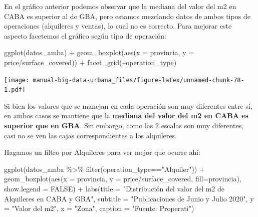 \documentclass[
  spanish,
]{book}
\newenvironment{Shaded}{\begin{snugshade}}{\end{snugshade}}
\newcommand{\AttributeTok}[1]{\textcolor[rgb]{0.77,0.63,0.00}{#1}}
\newcommand{\ConstantTok}[1]{\textcolor[rgb]{0.00,0.00,0.00}{#1}}
\newcommand{\FunctionTok}[1]{\textcolor[rgb]{0.00,0.00,0.00}{#1}}
\newcommand{\NormalTok}[1]{#1}
\newcommand{\SpecialCharTok}[1]{\textcolor[rgb]{0.00,0.00,0.00}{#1}}
\newcommand{\StringTok}[1]{\textcolor[rgb]{0.31,0.60,0.02}{#1}}
\begin{document}
En el gráfico anterior podemos observar que la mediana del valor del m2 en CABA es superior al de GBA, pero estamos mezclando datos de ambos tipos de operaciones (alquileres y ventas), lo cual no es correcto. Para mejorar este aspecto facetemos el gráfico según tipo de operación:

\begin{Shaded}
\begin{Highlighting}[]
\FunctionTok{ggplot}\NormalTok{(datos\_amba) }\SpecialCharTok{+}
  \FunctionTok{geom\_boxplot}\NormalTok{(}\FunctionTok{aes}\NormalTok{(}\AttributeTok{x =}\NormalTok{ provincia, }\AttributeTok{y =}\NormalTok{ price}\SpecialCharTok{/}\NormalTok{surface\_covered)) }\SpecialCharTok{+}
  \FunctionTok{facet\_grid}\NormalTok{(}\SpecialCharTok{\textasciitilde{}}\NormalTok{operation\_type)}
\end{Highlighting}
\end{Shaded}

\texttt{[image: manual-big-data-urbana\_files/figure-latex/unnamed-chunk-78-1.pdf]}

Si bien los valores que se manejan en cada operación son muy diferentes entre sí, en ambos casos se mantiene que la \textbf{mediana del valor del m2 en CABA es superior que en GBA}. Sin embargo, como las 2 escalas son muy diferentes, casi no se ven las cajas correspondientes a los alquileres.

Hagamos un filtro por Alquileres para ver mejor que ocurre ahí:

\begin{Shaded}
\begin{Highlighting}[]
\FunctionTok{ggplot}\NormalTok{(datos\_amba }\SpecialCharTok{\%\textgreater{}\%}
         \FunctionTok{filter}\NormalTok{(operation\_type}\SpecialCharTok{==}\StringTok{"Alquiler"}\NormalTok{)) }\SpecialCharTok{+}
  \FunctionTok{geom\_boxplot}\NormalTok{(}\FunctionTok{aes}\NormalTok{(}\AttributeTok{x =}\NormalTok{ provincia, }\AttributeTok{y =}\NormalTok{ price}\SpecialCharTok{/}\NormalTok{surface\_covered, }\AttributeTok{fill=}\NormalTok{provincia), }\AttributeTok{show.legend =} \ConstantTok{FALSE}\NormalTok{) }\SpecialCharTok{+}
  \FunctionTok{labs}\NormalTok{(}\AttributeTok{title =} \StringTok{"Distribución del valor del m2 de Alquileres en CABA y GBA"}\NormalTok{,}
       \AttributeTok{subtitle =} \StringTok{"Publicaciones de Junio y Julio 2020"}\NormalTok{,}
       \AttributeTok{y =} \StringTok{"Valor del m2"}\NormalTok{,}
       \AttributeTok{x =} \StringTok{"Zona"}\NormalTok{,}
       \AttributeTok{caption =} \StringTok{"Fuente: Properati"}\NormalTok{)}
\end{Highlighting}
\end{Shaded}
\end{document}

